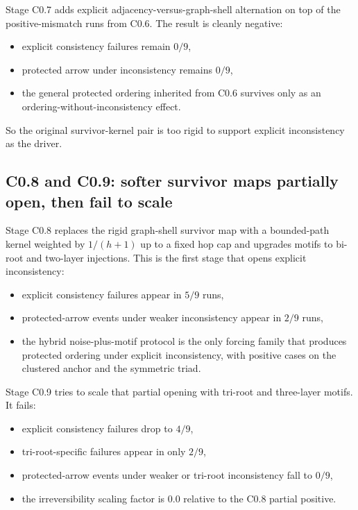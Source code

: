 \documentclass[11pt]{article}
\begin{document}
Stage C0.7 adds explicit adjacency-versus-graph-shell alternation on top of the positive-mismatch runs from C0.6. The result is cleanly negative:
\begin{itemize}
\item explicit consistency failures remain $0/9$,
\item protected arrow under inconsistency remains $0/9$,
\item the general protected ordering inherited from C0.6 survives only as an ordering-without-inconsistency effect.
\end{itemize}

So the original survivor-kernel pair is too rigid to support explicit inconsistency as the driver.

\subsection{C0.8 and C0.9: softer survivor maps partially open, then fail to scale}

Stage C0.8 replaces the rigid graph-shell survivor map with a bounded-path kernel weighted by $1/(h+1)$ up to a fixed hop cap and upgrades motifs to bi-root and two-layer injections. This is the first stage that opens explicit inconsistency:
\begin{itemize}
\item explicit consistency failures appear in $5/9$ runs,
\item protected-arrow events under weaker inconsistency appear in $2/9$ runs,
\item the hybrid noise-plus-motif protocol is the only forcing family that produces protected ordering under explicit inconsistency, with positive cases on the clustered anchor and the symmetric triad.
\end{itemize}

Stage C0.9 tries to scale that partial opening with tri-root and three-layer motifs. It fails:
\begin{itemize}
\item explicit consistency failures drop to $4/9$,
\item tri-root-specific failures appear in only $2/9$,
\item protected-arrow events under weaker or tri-root inconsistency fall to $0/9$,
\item the irreversibility scaling factor is $0.0$ relative to the C0.8 partial positive.
\end{itemize}
\end{document}
